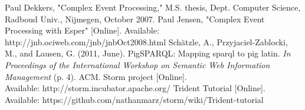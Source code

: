 \documentclass[conference, twocolumn, 11pt]{IEEEtran}
\theoremstyle{definition}
\begin{document}
\begin{thebibliography}{1}
        Paul Dekkers, "Complex Event Processing," M.S. thesis, Dept. Computer Science, Radboud Univ., Nijmegen, October 2007.
        Paul Jensen, "Complex Event Processing with Esper" [Online]. Available: http://jnb.ociweb.com/jnb/jnbOct2008.html
        Sch{\"a}tzle, A., Przyjaciel-Zablocki, M., and Lausen, G. (2011, June). PigSPARQL: Mapping sparql to pig latin. \emph{In Proceedings of the International Workshop on Semantic Web Information Management} (p. 4). ACM.
        Storm project [Online]. \\Available: http://storm.incubator.apache.org/
        Trident Tutorial [Online]. \\Available: https://github.com/nathanmarz/storm/wiki/Trident-tutorial

\end{thebibliography}

\onecolumn
\end{document}
